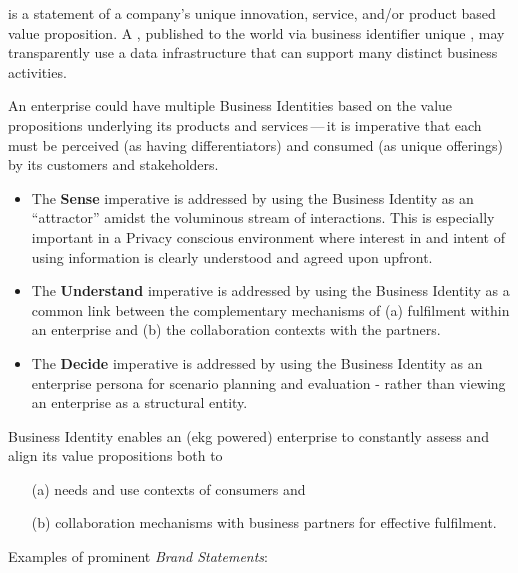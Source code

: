  is a statement of a company's unique innovation, service, and/or product based
value proposition.
A , published to the world via business identifier unique ,
may transparently use a data infrastructure that can support many distinct business activities.

An enterprise could have multiple Business Identities based on the value propositions underlying its
products and services\,---\,it is imperative that each must be perceived (as having differentiators) and
consumed (as unique offerings) by its customers and stakeholders.

\begin{itemize}
    \item The \textbf{Sense} imperative is addressed by using the Business Identity
          as an “attractor” amidst the voluminous stream of interactions.
          This is especially important in a Privacy conscious environment where interest in and intent of using
          information is clearly understood and agreed upon upfront.
    \item The \textbf{Understand} imperative is addressed by using the Business Identity as a common link between the
          complementary mechanisms of (a) fulfilment within an enterprise and (b) the collaboration contexts with
          the partners.
    \item The \textbf{Decide} imperative is addressed by using the Business Identity as an enterprise persona for scenario
          planning and evaluation - rather than viewing an enterprise as a structural entity.
\end{itemize}

Business Identity enables an (\gls{ekg} powered) enterprise to constantly assess and align its value propositions
both to

\begin{itemize}
    \item[(a)] needs and use contexts of consumers and
    \item[(b)] collaboration mechanisms with business partners for effective fulfilment.
\end{itemize}

Examples of prominent \textit{Brand Statements}:

